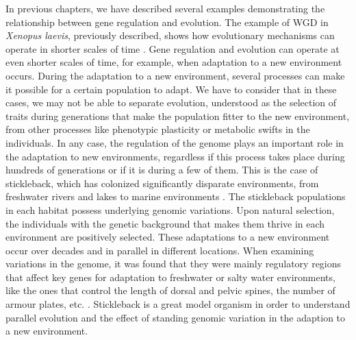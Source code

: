 In previous chapters, we have described several examples demonstrating the relationship between gene regulation and evolution. The example of WGD in \textit{Xenopus laevis}, previously described, shows how evolutionary mechanisms can operate in shorter scales of time \parencite{elurbe_regulatory_2017}. Gene regulation and evolution can operate at even shorter scales of time, for example, when adaptation to a new environment occurs. During the adaptation to a new environment, several processes can make it possible for a certain population to adapt. We have to consider that in these cases, we may not be able to separate evolution, understood as the selection of traits during generations that make the population fitter to the new environment, from other processes like phenotypic plasticity or metabolic swifts in the individuals. In any case, the regulation of the genome plays an important role in the adaptation to new environments, regardless if this process takes place during hundreds of generations or if it is during a few of them. This is the case of stickleback, which has colonized significantly disparate environments, from freshwater rivers and lakes to marine environments \parencite{reid_threespine_2021}. The stickleback populations in each habitat possess underlying genomic variations. Upon natural selection, the individuals with the genetic background that makes them thrive in each environment are positively selected. These adaptations to a new environment occur over decades and in parallel in different locations. When examining variations in the genome, it was found that they were mainly regulatory regions that affect key genes for adaptation to freshwater or salty water environments, like the ones that control the length of dorsal and pelvic spines, the number of armour plates, etc. \parencite{jones_genomic_2012, roberts_kingman_predicting_2021, bassham_repeated_2018}. Stickleback is a great model organism in order to understand parallel evolution and the effect of standing genomic variation in the adaption to a new environment.

